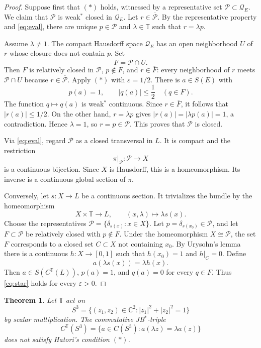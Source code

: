 \documentclass[11pt]{article}
\newtheorem{theorem}{Theorem}
\newcommand{\T}{\mathbb T}
\newcommand{\cQ}{\mathcal Q}
\newcommand{\cP}{\mathcal P}
\begin{document}
\begin{proof}
Suppose first that $(*)$ holds, witnessed by a representative set
$\cP\subset\cQ_E$.  We claim that $\cP$ is weak$^*$ closed in $\cQ_E$.
Let $r\in\overline{\cP}$.  By the representative property and
\eqref{eq:eval}, there are unique $p\in\cP$ and $\lambda\in\T$ such that
$r=\lambda p$.

Assume $\lambda\ne1$.  The compact Hausdorff space $\cQ_E$ has an open
neighborhood $U$ of $r$ whose closure does not contain $p$.  Set
\[
 F=\cP\cap\overline U.
\]
Then $F$ is relatively closed in $\cP$, $p\notin F$, and
$r\in\overline F$: every neighborhood of $r$ meets $\cP\cap U$ because
$r\in\overline{\cP}$.  Apply $(*)$ with $\varepsilon=1/2$.  There is
$a\in S(E)$ with
\[
 p(a)=1,\qquad |q(a)|\le\frac12\quad(q\in F).
\]
The function $q\mapsto q(a)$ is weak$^*$ continuous.  Since
$r\in\overline F$, it follows that $|r(a)|\le1/2$.  On the other hand,
$r=\lambda p$ gives $|r(a)|=|\lambda p(a)|=1$, a contradiction.  Hence
$\lambda=1$, so $r=p\in\cP$.  This proves that $\cP$ is closed.

Via \eqref{eq:eval}, regard $\cP$ as a closed transversal in $L$.  It is
compact and the restriction
\[
 \pi|_{\cP}:\cP\longrightarrow X
\]
is a continuous bijection.  Since $X$ is Hausdorff, this is a homeomorphism.
Its inverse is a continuous global section of $\pi$.

Conversely, let $s:X\to L$ be a continuous section.  It trivializes the
bundle by the homeomorphism
\[
 X\times\T\longrightarrow L,\qquad (x,\lambda)\longmapsto\lambda s(x).
\]
Choose the representatives $\cP=\{\delta_{s(x)}:x\in X\}$.  Let
$p=\delta_{s(x_0)}\in\cP$, and let $F\subset\cP$ be relatively closed with
$p\notin F$.  Under the homeomorphism $X\cong\cP$, the set $F$ corresponds
to a closed set $C\subset X$ not containing $x_0$.  By Urysohn's lemma there
is a continuous $h:X\to[0,1]$ such that $h(x_0)=1$ and $h|_C=0$.  Define
\[
 a(\lambda s(x))=\lambda h(x).
\]
Then $a\in S(C^{\T}(L))$, $p(a)=1$, and $q(a)=0$ for every $q\in F$.
Thus \eqref{eq:star} holds for every $\varepsilon>0$.
\end{proof}

\begin{theorem}\label{thm:hopf}
Let $\T$ act on
\[
 S^3=\{(z_1,z_2)\in\mathbb C^2:|z_1|^2+|z_2|^2=1\}
\]
by scalar multiplication.  The commutative JB$^*$-triple
\[
 C^{\T}(S^3)=
 \{a\in C(S^3):a(\lambda z)=\lambda a(z)\}
\]
does not satisfy Hatori's condition $(*)$.
\end{theorem}
\end{document}
